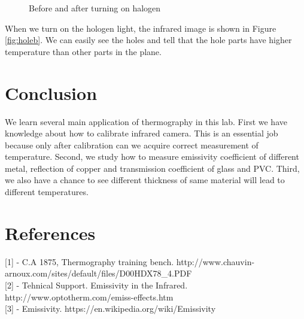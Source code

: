 \documentclass[english]{article}
\begin{document}
\begin{figure}[H]
	\centering
	\caption{Before and after turning on halogen}
	\label{fig:hole}
\end{figure}

When we turn on the hologen light, the infrared image is shown in Figure \ref{fig:holeb}. We can easily see the holes and tell that the hole parts have higher temperature than other parts in the plane.

\section{Conclusion}
We learn several main application of thermography in this lab. First we have knowledge about how to calibrate infrared camera. This is an essential job because only after calibration can we acquire correct measurement of temperature. Second, we study how to measure emissivity coefficient of different metal, reflection of copper and transmission coefficient of glass and PVC. Third, we also have a chance to see different thickness of same material will lead to different temperatures.

\section{References}
{[}1{]} - C.A 1875, Thermography training bench. http://www.chauvin-arnoux.com/sites/default/files/D00HDX78\_4.PDF\\
{[}2{]} - Tehnical Support. Emissivity in the Infrared. http://www.optotherm.com/emiss-effects.htm\\
{[}3{]} - Emissivity. https://en.wikipedia.org/wiki/Emissivity
\end{document}
